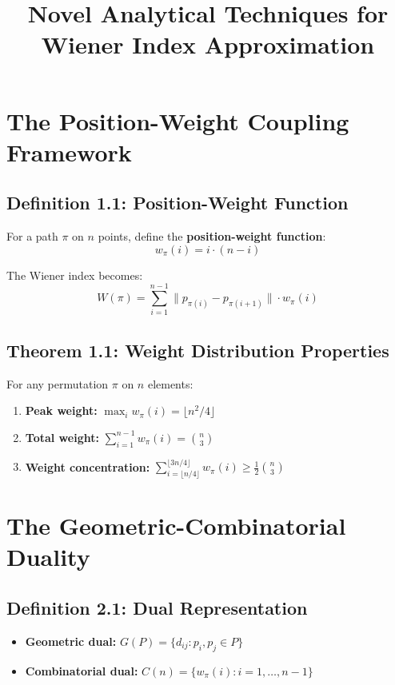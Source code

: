\documentclass{article}
\title{Novel Analytical Techniques for Wiener Index Approximation}
\author{}
\date{}
\begin{document}
\maketitle

\section{The Position-Weight Coupling Framework}

\subsection*{Definition 1.1: Position-Weight Function}
For a path $\pi$ on $n$ points, define the \textbf{position-weight function}:
\[
	w_\pi(i) = i \cdot (n-i)
\]

The Wiener index becomes:
\[
	W(\pi) = \sum_{i=1}^{n-1} \|p_{\pi(i)} - p_{\pi(i+1)}\| \cdot w_\pi(i)
\]

\subsection*{Theorem 1.1: Weight Distribution Properties}
For any permutation $\pi$ on $n$ elements:
\begin{enumerate}
	\item \textbf{Peak weight:} $\max_i w_\pi(i) = \lfloor n^2/4 \rfloor$
	\item \textbf{Total weight:} $\sum_{i=1}^{n-1} w_\pi(i) = \binom{n}{3}$
	\item \textbf{Weight concentration:} $\sum_{i=\lfloor n/4 \rfloor}^{\lfloor 3n/4 \rfloor} w_\pi(i) \geq \frac{1}{2} \binom{n}{3}$
\end{enumerate}

\section{The Geometric-Combinatorial Duality}

\subsection*{Definition 2.1: Dual Representation}
\begin{itemize}
	\item \textbf{Geometric dual:} $G(P) = \{d_{ij} : p_i, p_j \in P\}$
	\item \textbf{Combinatorial dual:} $C(n) = \{w_\pi(i) : i = 1, \ldots, n-1\}$
\end{itemize}
\end{document}
